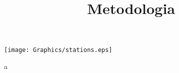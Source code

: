 \title{Metodologia}
\begin{minipage}{0.35\linewidth}
    \centering
    \texttt{[image: Graphics/stations.eps]}
\end{minipage}
\hspace{0.3cm}
\begin{minipage}{0.6\linewidth}
    a
\end{minipage}